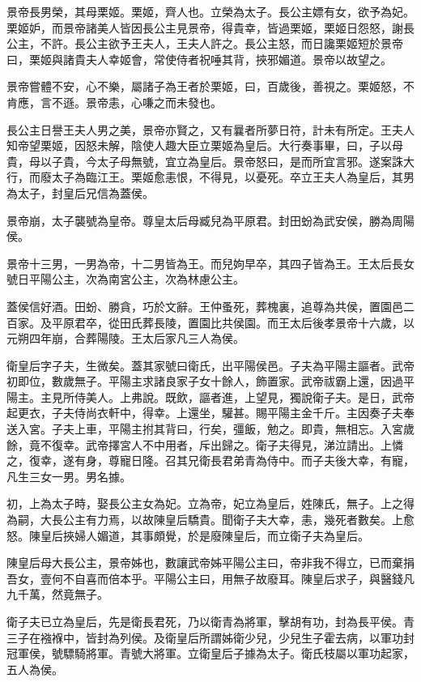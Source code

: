 景帝長男榮，其母栗姬。栗姬，齊人也。立榮為太子。長公主嫖有女，欲予為妃。栗姬妒，而景帝諸美人皆因長公主見景帝，得貴幸，皆過栗姬，栗姬日怨怒，謝長公主，不許。長公主欲予王夫人，王夫人許之。長公主怒，而日讒栗姬短於景帝曰，栗姬與諸貴夫人幸姬會，常使侍者祝唾其背，挾邪媚道。景帝以故望之。

景帝嘗體不安，心不樂，屬諸子為王者於栗姬，曰，百歲後，善視之。栗姬怒，不肯應，言不遜。景帝恚，心嗛之而未發也。

長公主日譽王夫人男之美，景帝亦賢之，又有曩者所夢日符，計未有所定。王夫人知帝望栗姬，因怒未解，陰使人趣大臣立栗姬為皇后。大行奏事畢，曰，子以母貴，母以子貴，今太子母無號，宜立為皇后。景帝怒曰，是而所宜言邪。遂案誅大行，而廢太子為臨江王。栗姬愈恚恨，不得見，以憂死。卒立王夫人為皇后，其男為太子，封皇后兄信為蓋侯。

景帝崩，太子襲號為皇帝。尊皇太后母臧兒為平原君。封田蚡為武安侯，勝為周陽侯。

景帝十三男，一男為帝，十二男皆為王。而兒姁早卒，其四子皆為王。王太后長女號日平陽公主，次為南宮公主，次為林慮公主。

蓋侯信好酒。田蚡、勝貪，巧於文辭。王仲蚤死，葬槐裏，追尊為共侯，置園邑二百家。及平原君卒，從田氏葬長陵，置園比共侯園。而王太后後孝景帝十六歲，以元朔四年崩，合葬陽陵。王太后家凡三人為侯。

衛皇后字子夫，生微矣。蓋其家號曰衛氏，出平陽侯邑。子夫為平陽主謳者。武帝初即位，數歲無子。平陽主求諸良家子女十餘人，飾置家。武帝祓霸上還，因過平陽主。主見所侍美人。上弗說。既飲，謳者進，上望見，獨說衛子夫。是日，武帝起更衣，子夫侍尚衣軒中，得幸。上還坐，驩甚。賜平陽主金千斤。主因奏子夫奉送入宮。子夫上車，平陽主拊其背曰，行矣，彊飯，勉之。即貴，無相忘。入宮歲餘，竟不復幸。武帝擇宮人不中用者，斥出歸之。衛子夫得見，涕泣請出。上憐之，復幸，遂有身，尊寵日隆。召其兄衛長君弟青為侍中。而子夫後大幸，有寵，凡生三女一男。男名據。

初，上為太子時，娶長公主女為妃。立為帝，妃立為皇后，姓陳氏，無子。上之得為嗣，大長公主有力焉，以故陳皇后驕貴。聞衛子夫大幸，恚，幾死者數矣。上愈怒。陳皇后挾婦人媚道，其事頗覺，於是廢陳皇后，而立衛子夫為皇后。

陳皇后母大長公主，景帝姊也，數讓武帝姊平陽公主曰，帝非我不得立，已而棄捐吾女，壹何不自喜而倍本乎。平陽公主曰，用無子故廢耳。陳皇后求子，與醫錢凡九千萬，然竟無子。

衛子夫已立為皇后，先是衛長君死，乃以衛青為將軍，擊胡有功，封為長平侯。青三子在襁褓中，皆封為列侯。及衛皇后所謂姊衛少兒，少兒生子霍去病，以軍功封冠軍侯，號驃騎將軍。青號大將軍。立衛皇后子據為太子。衛氏枝屬以軍功起家，五人為侯。

